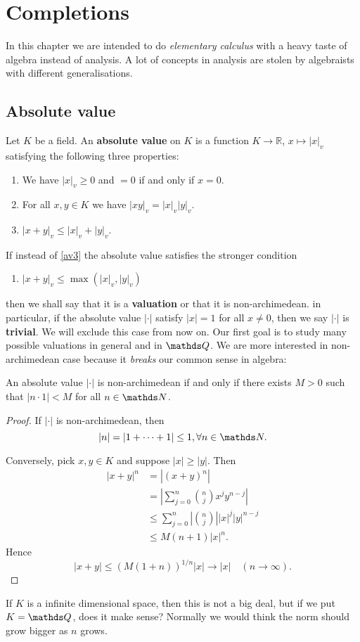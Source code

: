 \chapter{Completions}
	In this chapter we are intended to do \textit{elementary calculus} with a heavy taste of algebra instead of analysis. A lot of concepts in analysis are stolen by algebraists with different generalisations.
	\section{Absolute value}
		Let $K$ be a field. An \textbf{absolute value} on $K$ is a function $K \to \mathbb{R}$, $x \mapsto |x|_v$ satisfying the following three properties:
		\begin{enumerate}[start=1,label={\bfseries AV \arabic*}]
			\item We have $|x|_v \ge 0$ and $=0$ if and only if $x = 0$.
			\item For all $x,y \in K$ we have $|xy|_v = |x|_v|y|_v$.
			\item $|x+y|_v \le |x|_v + |y|_v$. \label{av3}
		\end{enumerate}
	
		If instead of \ref{av3} the absolute value satisfies the stronger condition
		\begin{enumerate}[start=4,label={\bfseries AV \arabic*}]
			\item $|x+y|_v \le \max(|x|_v,|y|_v)$
		\end{enumerate}
		then we shall say that it is a \textbf{valuation} or that it is non-archimedean. in particular, if the absolute value $|\cdot|$ satisfy $|x|=1$ for all $x \ne 0$, then we say $|\cdot|$ is \textbf{trivial}. We will exclude this case from now on. Our first goal is to study many possible valuations in general and in $\Q$. We are more interested in non-archimedean case because it \textit{breaks} our common sense in algebra:
		\begin{theorem}
			An absolute value $|\cdot|$ is non-archimedean if and only if there exists $M>0$ such that $|n \cdot 1|<M$ for all $n \in \N$.
		\end{theorem}
		\begin{proof}
			If $|\cdot|$ is non-archimedean, then
			\[
				|n| = |1+\cdots+1| \le 1, \forall n \in \N.
			\]
			
			Conversely, pick $x,y \in K$ and suppose $|x| \ge |y|$. Then
			\[
				\begin{aligned}
					|x+y|^n &= |(x+y)^n| \\
							&= \left|\sum_{j=0}^{n}{n \choose j}x^jy^{n-j}\right| \\
							&\le \sum_{j=0}^{n}\left|{n \choose j} \right||x|^j|y|^{n-j} \\
							&\le M(n+1)|x|^n.
				\end{aligned}
			\]
			Hence
			\[
				|x+y| \le \left(M(1+n)\right)^{1/n}|x| \to |x| \quad (n \to \infty).
			\]
		\end{proof}
		If $K$ is a infinite dimensional space, then this is not a big deal, but if we put $K=\Q$, does it make sense? Normally we would think the norm should grow bigger as $n$ grows.
